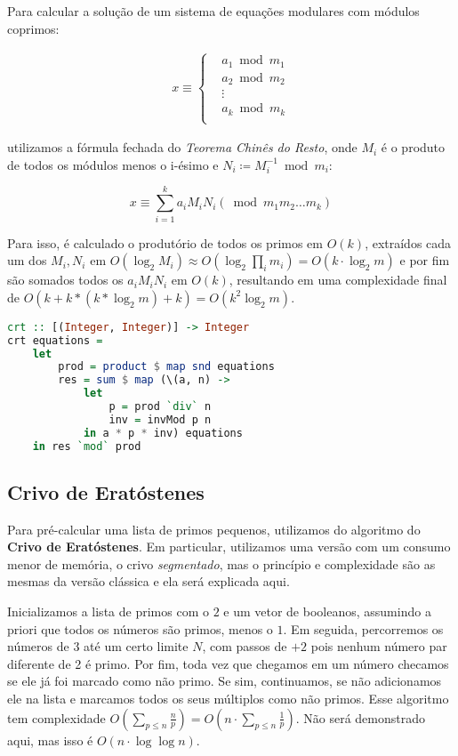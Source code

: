 \documentclass{article}
\begin{document}
Para calcular a solução de um sistema de equações modulares com módulos coprimos:

\begin{align*}
  x \equiv \begin{cases}
    &a_1 \bmod m_1 \\
    &a_2 \bmod m_2 \\
    &\vdots \\
    &a_k \bmod m_k \\
\end{cases}
\end{align*}

utilizamos a fórmula fechada do \textit{Teorema Chinês do Resto}, onde $M_i$ é o produto de todos os módulos menos o i-ésimo e $N_i \coloneq M_i^{-1} \bmod m_i$:

\[
  x \equiv \sum_{i=1}^{k} a_iM_iN_i (\bmod m_1m_2 \ldots m_k)
\]

Para isso, é calculado o produtório de todos os primos em $O(k)$, extraídos cada um dos $M_i, N_i$ em $O(\log_2 M_i) \approx O(\log_2 \prod_i m_i) = O(k \cdot \log_2 m)$ e por fim são somados todos os $a_iM_iN_i$ em $O(k)$, resultando em uma complexidade final de $O(k + k*(k* \log_2 m) + k) = O(k^2 \log_2 m)$.

\begin{minipage}{.9\linewidth}
\begin{lstlisting}[language=haskell,caption=Teorema Chinês do Resto]
crt :: [(Integer, Integer)] -> Integer
crt equations = 
    let
        prod = product $ map snd equations
        res = sum $ map (\(a, n) ->
            let
                p = prod `div` n
                inv = invMod p n
            in a * p * inv) equations
    in res `mod` prod
\end{lstlisting}
\end{minipage} 

\subsection{Crivo de Eratóstenes}

Para pré-calcular uma lista de primos pequenos, utilizamos do algoritmo do \textbf{Crivo de Eratóstenes}. Em particular, utilizamos uma versão com um consumo menor de memória, o crivo \textit{segmentado}, mas o princípio e complexidade são as mesmas da versão clássica e ela será explicada aqui.

Inicializamos a lista de primos com o $2$ e um vetor de booleanos, assumindo a priori que todos os números são primos, menos o $1$. Em seguida, percorremos os números de $3$ até um certo limite $N$, com passos de $+2$ pois nenhum número par diferente de 2 é primo. Por fim, toda vez que chegamos em um número checamos se ele já foi marcado como não primo. Se sim, continuamos, se não adicionamos ele na lista e marcamos todos os seus múltiplos como não primos. Esse algoritmo tem complexidade $O(\sum_{p \leq n} \frac{n}{p}) = O(n \cdot \sum_{p \leq n}\frac{1}{p})$. Não será demonstrado aqui, mas isso é $O(n \cdot \log \log n)$.
\end{document}
